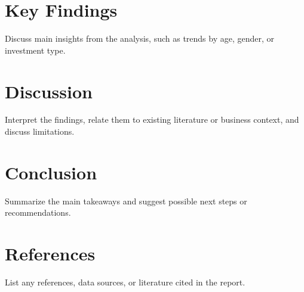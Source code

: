 \documentclass[12pt]{article}
\begin{document}
\section{Key Findings}
Discuss main insights from the analysis, such as trends by age, gender, or investment type.

\section{Discussion}
Interpret the findings, relate them to existing literature or business context, and discuss limitations.

\section{Conclusion}
Summarize the main takeaways and suggest possible next steps or recommendations.

\section*{References}
List any references, data sources, or literature cited in the report.
\end{document}
